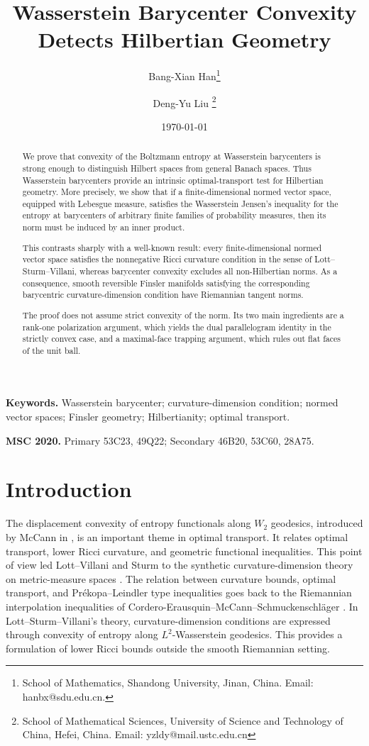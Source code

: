 \documentclass[a4paper,11pt]{article}
\title{\textbf{Wasserstein Barycenter Convexity Detects Hilbertian Geometry}}
\author{Bang-Xian Han\thanks{School of Mathematics, Shandong University, Jinan, China. Email: hanbx@sdu.edu.cn.}
	\and Deng-Yu Liu
	\thanks{School of Mathematical Sciences, University of Science and Technology of China, Hefei, China. Email: yzldy@mail.ustc.edu.cn}}
\date{\today}
\numberwithin{equation}{section}
\begin{document}
	\maketitle
	
	
	

		\begin{abstract}
We prove that convexity of the Boltzmann entropy at Wasserstein barycenters
is strong enough to distinguish Hilbert spaces from general Banach
spaces. Thus Wasserstein barycenters provide an intrinsic optimal-transport
test for Hilbertian geometry. More precisely, we show that if a finite-dimensional normed vector space, equipped with Lebesgue measure, satisfies the Wasserstein Jensen's inequality for the entropy at barycenters of arbitrary finite families of probability measures, then its norm must be induced by an inner product.

This contrasts sharply with a well-known result: every finite-dimensional normed vector space
satisfies the  nonnegative Ricci curvature condition in the  sense of Lott--Sturm--Villani, whereas barycenter convexity excludes all
non-Hilbertian norms. As a consequence, smooth reversible Finsler manifolds
satisfying the corresponding barycentric curvature-dimension condition have
Riemannian tangent norms.

The proof does not assume 
strict convexity of the norm. Its two main ingredients are a rank-one
polarization argument, which yields the dual parallelogram identity in the
strictly convex case, and a maximal-face trapping argument, which rules out
flat faces of the unit ball.
\end{abstract}

	
	\medskip
	\noindent\textbf{Keywords.}
	Wasserstein barycenter; curvature-dimension condition; normed vector spaces; Finsler geometry; Hilbertianity; optimal transport.
	
	\medskip
	\noindent\textbf{MSC 2020.}
	Primary 53C23, 49Q22; Secondary 46B20, 53C60, 28A75.
	
	
\tableofcontents
	
	
	\section{Introduction}\label{sec:introduction}
	The displacement convexity of entropy functionals along $W_2$ geodesics, introduced by McCann in \cite{McCann1997}, is an important theme in optimal transport. It relates optimal transport, lower Ricci curvature, and geometric functional inequalities. This point of view led Lott--Villani and Sturm to the synthetic curvature-dimension theory on metric-measure spaces \cite{LottVillani,SturmI,SturmII}. The relation between curvature bounds, optimal transport, and Pr\'ekopa--Leindler type inequalities goes back to the Riemannian interpolation inequalities of Cordero-Erausquin--McCann--Schmuckenschl\"ager \cite{CEMS,CEMS2006}.
	In Lott--Sturm--Villani's theory, curvature-dimension conditions are expressed through convexity of entropy along $L^2$-Wasserstein geodesics. This provides a formulation of lower Ricci bounds outside the smooth Riemannian setting.
	
\end{document}
